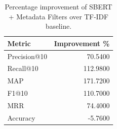 \begin{table}[htbp]
\centering
\caption{Percentage improvement of SBERT + Metadata Filters over TF-IDF baseline.}
\label{tab:improvement_summary}
\begin{tabular}{lr}
\toprule
Metric & Improvement \% \\
\midrule
Precision@10 & 70.5400 \\
Recall@10 & 112.9800 \\
MAP & 171.7200 \\
F1@10 & 110.7000 \\
MRR & 74.4000 \\
Accuracy & -5.7600 \\
\bottomrule
\end{tabular}
\end{table}
